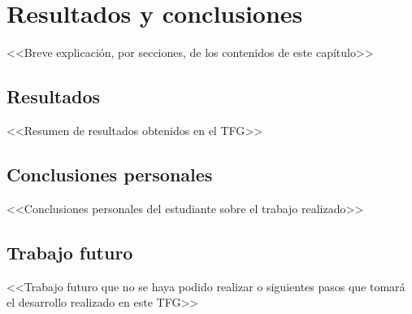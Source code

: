 \chapter{Resultados y conclusiones} \label{chp:resultados}

<<Breve explicación, por secciones, de los contenidos de este capítulo>>


\section{Resultados} \label{sct:resultados_resultados}

<<Resumen de resultados obtenidos en el TFG>>


\section{Conclusiones personales} \label{sct:resultados_conclusiones}

<<Conclusiones personales del estudiante sobre el trabajo realizado>>


\section{Trabajo futuro} \label{sct:resultados_trabajofuturo}

<<Trabajo futuro que no se haya podido realizar o siguientes pasos que tomará el desarrollo realizado en este TFG>>